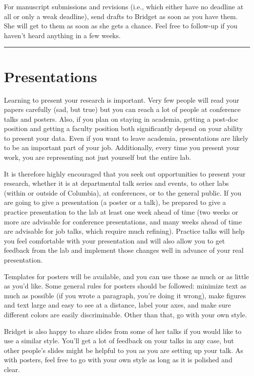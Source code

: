 \documentclass[]{book}
\begin{document}
For manuscript submissions and revisions (i.e., which either have no deadline at all or only a weak deadline), send drafts to Bridget as soon as you have them. She will get to them as soon as she gets a chance. Feel free to follow-up if you haven't heard anything in a few weeks.

\begin{center}\rule{0.5\linewidth}{0.5pt}\end{center}

\hypertarget{presentations}{%
\section{Presentations}\label{presentations}}

Learning to present your research is important. Very few people will read your papers carefully (sad, but true) but you can reach a lot of people at conference talks and posters. Also, if you plan on staying in academia, getting a post-doc position and getting a faculty position both significantly depend on your ability to present your data. Even if you want to leave academia, presentations are likely to be an important part of your job. Additionally, every time you present your work, you are representing not just yourself but the entire lab.

It is therefore highly encouraged that you seek out opportunities to present your research, whether it is at departmental talk series and events, to other labs (within or outside of Columbia), at conferences, or to the general public. If you are going to give a presentation (a poster or a talk), be prepared to give a practice presentation to the lab at least one week ahead of time (two weeks or more are advisable for conference presentations, and many weeks ahead of time are advisable for job talks, which require much refining). Practice talks will help you feel comfortable with your presentation and will also allow you to get feedback from the lab and implement those changes well in advance of your real presentation.

Templates for posters will be available, and you can use those as much or as little as you'd like. Some general rules for posters should be followed: minimize text as much as possible (if you wrote a paragraph, you're doing it wrong), make figures and text large and easy to see at a distance, label your axes, and make sure different colors are easily discriminable. Other than that, go with your own style.

Bridget is also happy to share slides from some of her talks if you would like to use a similar style. You'll get a lot of feedback on your talks in any case, but other people's slides might be helpful to you as you are setting up your talk. As with posters, feel free to go with your own style as long as it is polished and clear.
\end{document}
